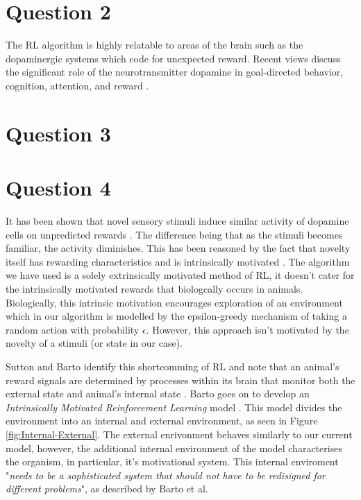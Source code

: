 \documentclass[10pt, a4paper]{article}
\begin{document}
\section*{Question 2}
The RL algorithm is highly relatable to areas of the brain such as the dopaminergic systems \cite{roelfsema2018control} which code for unexpected reward. Recent views discuss the significant role of the neurotransmitter dopamine in  goal-directed behavior, cognition, attention, and reward \cite{schultz2002getting}.

\section*{Question 3}


\section*{Question 4}
It has been shown that novel sensory stimuli induce similar activity of dopamine cells on unpredicted rewards \cite{kakade2002dopamine}. The difference being that as the stimuli becomes familiar, the activity diminishes. This has been reasoned by the fact that novelty itself has rewarding characteristics \cite{reed1996intrinsic} and is intrinsically motivated \cite{dayan2002reward}. The algorithm we have used is a solely extrinsically motivated method of RL, it doesn't cater for the intrinsically motivated rewards that biologcally occurs in animals. Biologically, this intrinsic motivation encourages exploration of an environment which in our algorithm is modelled by the epsilon-greedy mechanism of taking a random action with probability $\epsilon$. However, this approach isn't motivated by the novelty of a stimuli (or state in our case). 

Sutton and Barto identify this shortcomming of RL and note that an animal's reward signals are determined by processes within its brain that monitor both the external state and animal's internal state \cite{sutton1998introduction}. Barto goes on to develop an \textit{Intrinsically Motivated Reinforcement Learning} model \cite{chentanez2005intrinsically}. This model divides the environment into an internal and external environment, as seen in Figure \ref{fig:Internal-External}. The external enrivonment behaves similarly to our current model, however, the additional internal environment of the model characterises the organism, in particular, it's motivational system. This internal enviroment "\textit{needs to be a sophisticated system that should not have to be redisigned for different problems}", as described by Barto et al. 
\end{document}
